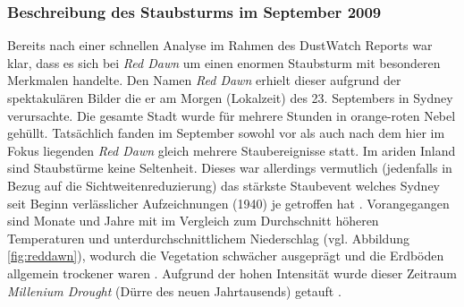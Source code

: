 \documentclass[12pt,a4paper,onecolumn,draft]{scrartcl}
\begin{document}
\subsubsection{Beschreibung des Staubsturms im September 2009} \label{sec:reddawn}
Bereits nach einer schnellen Analyse im Rahmen des DustWatch Reports \citep{Leys.2009} war klar, dass es sich bei \textit{Red Dawn} um einen enormen Staubsturm mit besonderen Merkmalen handelte. Den Namen \textit{Red Dawn} erhielt dieser aufgrund der spektakulären Bilder die er am Morgen (Lokalzeit) des 23. Septembers in Sydney verursachte. Die gesamte Stadt wurde für mehrere Stunden in orange-roten Nebel gehüllt. Tatsächlich fanden im September sowohl vor als auch nach dem hier im Fokus liegenden \textit{Red Dawn} gleich mehrere Staubereignisse statt. Im ariden Inland sind Staubstürme keine Seltenheit. Dieses war allerdings vermutlich (jedenfalls in Bezug auf die Sichtweitenreduzierung) das stärkste Staubevent welches Sydney seit Beginn verlässlicher Aufzeichnungen (1940) je getroffen hat \citep{Leys.2011}. Vorangegangen sind Monate und Jahre mit im Vergleich zum Durchschnitt höheren Temperaturen und unterdurchschnittlichem Niederschlag (vgl. Abbildung \ref{fig:reddawn}), wodurch die Vegetation schwächer ausgeprägt und die Erdböden allgemein trockener waren \citep{Leys.2011}. Aufgrund der hohen Intensität wurde dieser Zeitraum \textit{Millenium Drought} (Dürre des neuen Jahrtausends) getauft \citep{Deckker.2014}.
\end{document}

